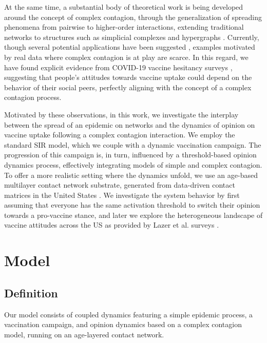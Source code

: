 \documentclass[
 reprint,
 amsmath,amssymb,
 aps,
]{revtex4-2}
\begin{document}
At the same time, a substantial body of theoretical work is being developed around the concept of complex contagion, through the generalization of spreading phenomena from pairwise to higher-order interactions, extending traditional networks to structures such as simplicial complexes and hypergraphs \cite{iacopini2019simplicial, de2020social, battiston2021physics}. Currently, though several potential applications have been suggested \cite{ferraz2024contagion}, examples motivated by real data where complex contagion is at play are scarce. In this regard, we have found explicit evidence from COVID-19 vaccine hesitancy surveys \cite{lazer2021covid}, suggesting that people's attitudes towards vaccine uptake could depend on the behavior of their social peers, perfectly aligning with the concept of a complex contagion process.

Motivated by these observations, in this work, we investigate the interplay between the spread of an epidemic on networks and the dynamics of opinion on vaccine uptake following a complex contagion interaction. We employ the standard SIR model, which we couple with a dynamic vaccination campaign. The progression of this campaign is, in turn, influenced by a threshold-based opinion dynamics process, effectively integrating models of simple and complex contagion. To offer a more realistic setting where the dynamics unfold, we use an age-based multilayer contact network substrate, generated from data-driven contact matrices in the United States \cite{mistry2021inferring}. We investigate the system behavior by first assuming that everyone has the same activation threshold to switch their opinion towards a pro-vaccine stance, and later we explore the heterogeneous landscape of vaccine attitudes across the US as provided by Lazer et al. surveys \cite{lazer2021covid}.

\section{Model}
\label{sec:model}

\subsection{Definition}
\label{subsec:definition}

Our model consists of coupled dynamics featuring a simple epidemic process, a vaccination campaign, and opinion dynamics based on a complex contagion model, running on an age-layered contact network. 
\end{document}

